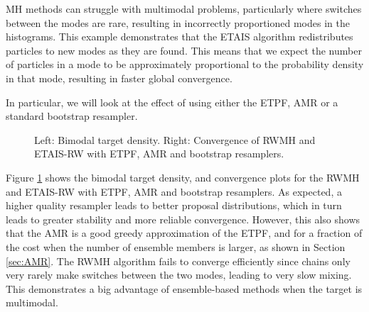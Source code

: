 \documentclass[final]{siamltex}
\begin{document}
MH methods can struggle
with multimodal problems, particularly where switches between the
modes are rare, resulting in incorrectly proportioned modes in the
histograms. This example demonstrates that the ETAIS algorithm
redistributes particles to new modes as they are found. This means
that we expect the number of particles in a mode to be approximately
proportional to the probability density in that mode, resulting in
faster global convergence. {\red In particular, we will look at the effect
of using either the ETPF, AMR or a standard bootstrap resampler.

\begin{figure}[htb]
\centering 
{}

\caption{Left: Bimodal target density. Right: Convergence of RWMH and
  ETAIS-RW with ETPF, AMR and bootstrap resamplers. }
\label{kshdbf}
\end{figure}

Figure \ref{kshdbf} shows the bimodal target density, and convergence
plots for the RWMH and ETAIS-RW with ETPF, AMR and bootstrap
resamplers. As expected, a higher quality resampler leads to better
proposal distributions, which in turn leads to greater stability and
more reliable convergence. However, this also shows that the AMR is a
good greedy approximation of the ETPF, and for a fraction of the cost
when the number of ensemble members is larger, as shown in Section
\ref{sec:AMR}. The RWMH algorithm fails to converge efficiently since chains only very rarely
make switches between the two modes, leading to very slow mixing. This
demonstrates a big advantage of ensemble-based methods when the target
is multimodal.

}
\end{document}
